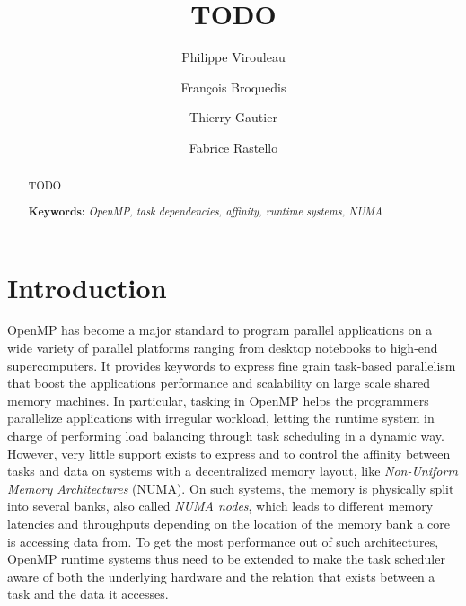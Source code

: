 \documentclass{Styles/llncs}
\begin{document}
\title{TODO}
\author{
  Philippe Virouleau \and François Broquedis \and Thierry Gautier \and Fabrice Rastello
 \vspace*{-1ex}}
\date{}
\maketitle

\begin{abstract}
  \vspace*{-5ex} TODO

\smallskip
  \noindent\textbf{Keywords:}
  \emph{
    OpenMP, task dependencies, affinity, runtime systems, NUMA
  }
\end{abstract}


\section{Introduction}

OpenMP has become a major standard to program parallel applications on a wide variety of parallel platforms ranging from desktop notebooks to high-end supercomputers. It provides keywords to express fine grain task-based parallelism that boost the applications performance and scalability on large scale shared memory machines. In particular, tasking in OpenMP helps the programmers parallelize applications with irregular workload, letting the runtime system in charge of performing load balancing through task scheduling in a dynamic way. However, very little support exists to express and to control the affinity between tasks and data on systems with a decentralized memory layout, like \emph{Non-Uniform Memory Architectures} (NUMA). On such systems, the memory is physically split into several banks, also called \emph{NUMA nodes}, which leads to different memory latencies and throughputs depending on the location of the memory bank a core is accessing data from. To get the most performance out of such architectures, OpenMP runtime systems thus need to be extended to make the task scheduler aware of both the underlying hardware and the relation that exists between a task and the data it accesses.
\end{document}
